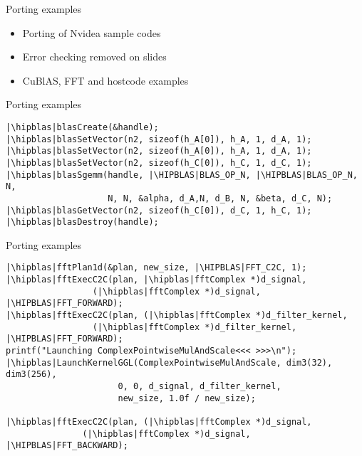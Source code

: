 \documentclass[aspectratio=169]{beamer}
\newcommand{\hipblas}{\sout{\color{red}{cu}}\textbf{\color{green}{hip}}}
\newcommand{\HIPBLAS}{\sout{\color{red}{CU}}\textbf{\color{green}{HIP}}}
\begin{document}
\begin{frame}[fragile]{Porting examples}
\begin{itemize}
    \item Porting of Nvidea sample codes
    \item Error checking removed on slides
    \item CuBlAS, FFT and hostcode examples
    
\end{itemize}

\end{frame}


\begin{frame}[fragile]{Porting examples}
\begin{verbatim}
|\hipblas|blasCreate(&handle);
|\hipblas|blasSetVector(n2, sizeof(h_A[0]), h_A, 1, d_A, 1);
|\hipblas|blasSetVector(n2, sizeof(h_A[0]), h_A, 1, d_A, 1);
|\hipblas|blasSetVector(n2, sizeof(h_C[0]), h_C, 1, d_C, 1);
|\hipblas|blasSgemm(handle, |\HIPBLAS|BLAS_OP_N, |\HIPBLAS|BLAS_OP_N, N, 
                    N, N, &alpha, d_A,N, d_B, N, &beta, d_C, N);
|\hipblas|blasGetVector(n2, sizeof(h_C[0]), d_C, 1, h_C, 1);
|\hipblas|blasDestroy(handle);
\end{verbatim}
\end{frame}

\begin{frame}[fragile]{Porting examples}
\begin{verbatim}
|\hipblas|fftPlan1d(&plan, new_size, |\HIPBLAS|FFT_C2C, 1);
|\hipblas|fftExecC2C(plan, |\hipblas|fftComplex *)d_signal,
                 (|\hipblas|fftComplex *)d_signal, |\HIPBLAS|FFT_FORWARD);
|\hipblas|fftExecC2C(plan, (|\hipblas|fftComplex *)d_filter_kernel,
                 (|\hipblas|fftComplex *)d_filter_kernel, |\HIPBLAS|FFT_FORWARD);
printf("Launching ComplexPointwiseMulAndScale<<< >>>\n");
|\hipblas|LaunchKernelGGL(ComplexPointwiseMulAndScale, dim3(32), dim3(256),
                      0, 0, d_signal, d_filter_kernel,
                      new_size, 1.0f / new_size);

|\hipblas|fftExecC2C(plan, (|\hipblas|fftComplex *)d_signal,
               (|\hipblas|fftComplex *)d_signal, |\HIPBLAS|FFT_BACKWARD);
\end{verbatim}
\end{frame}
\end{document}
